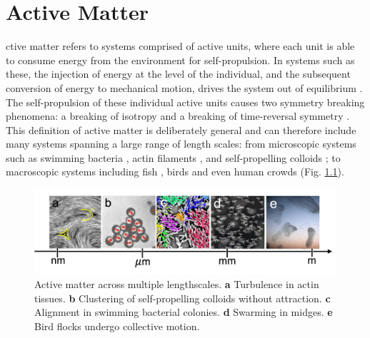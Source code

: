 %
%
\let\textcircled=\pgftextcircled
\chapter{Active Matter}
\label{chap:activeMatter}




ctive matter refers to systems comprised of active units, where each unit is able to consume energy from the environment for self-propulsion.
 In systems such as these, the injection of energy at the level of the individual, and the subsequent conversion of energy to mechanical motion, drives the system out of equilibrium \cite{ramaswamy2017}. The self-propulsion of these individual active units causes two symmetry breaking phenomena: a breaking of isotropy \cite{marchetti2013} and a breaking of time-reversal symmetry \cite{obyrne2022a}.
This definition of active matter is deliberately general and can therefore include many systems spanning a large range of length scales: from microscopic systems such as swimming bacteria \cite{zhang2010b}, actin filaments \cite{schaller2010}, and self-propelling colloids \cite{theurkauff2012}; to macroscopic systems including fish \cite{gautrais2009}, birds \cite{cavagna2014} and even human crowds \cite{bottinelli2016} (Fig. \ref{fig:AMcollage}).

\begin{figure}
	\includegraphics[width=\linewidth]{chapters/activeMatter/figsActiveMatter/figAMcollage.png}
	\caption[Active matter across multiple lengthscales]{Active matter across multiple lengthscales. \textbf{a} Turbulence in actin tissues. \textbf{b} Clustering of self-propelling colloids without attraction. \textbf{c} Alignment in swimming bacterial colonies. \textbf{d} Swarming in midges. \textbf{e} Bird flocks undergo collective motion.}
	\label{fig:AMcollage}
\end{figure}


